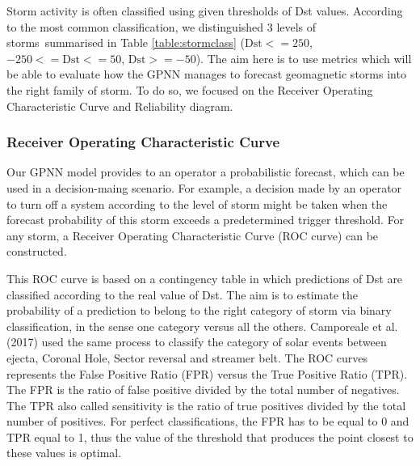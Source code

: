 Storm activity is often classified using given thresholds of Dst values. According to the most common 
classification, we distinguished 3 levels of storms summarised in Table \ref{table:stormclass} 
($\text{Dst} <= 250$, $-250 <= \text{Dst} <= 50$, $\text{Dst} >= -50$). The aim here is to use metrics 
which will be able to evaluate how the GPNN manages to forecast geomagnetic storms into the 
right family of storm. To do so, we focused on the Receiver Operating Characteristic Curve and 
Reliability diagram.



\subsubsection{Receiver Operating Characteristic Curve}


Our GPNN model provides to an operator a probabilistic forecast, which can be used in a decision-maing scenario. 
For example, a decision made by an operator to turn off a system according to the level of storm might be taken 
when the forecast probability of this storm exceeds a predetermined trigger threshold. For any storm, 
a Receiver Operating Characteristic Curve (ROC curve) can be constructed. 

This ROC curve is based on a contingency table in which predictions of Dst are classified according to the 
real value of Dst. The aim is to estimate the probability of a prediction to belong to the right category of storm 
via binary classification, in the sense one category versus all the others. Camporeale et al. (2017) used the 
same process to classify the category of solar events between ejecta, Coronal Hole, Sector reversal and streamer belt. 
The ROC curves represents the False Positive Ratio (FPR) versus the True Positive Ratio (TPR). The FPR is the ratio 
of false positive divided by the total number of negatives. The TPR also called sensitivity is the ratio of 
true positives divided by the total number of positives. For perfect classifications, the FPR has to be equal to 0 
and TPR equal to 1, thus the value of the threshold that produces the point closest to these values is optimal. 


